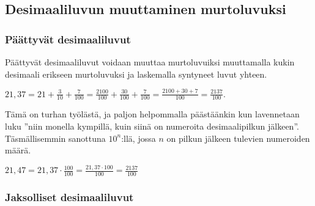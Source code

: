 
\subsection*{Desimaaliluvun muuttaminen murtoluvuksi}

\subsubsection*{Päättyvät desimaaliluvut}

Päättyvät desimaaliluvut voidaan muuttaa murtoluvuiksi muuttamalla kukin
desimaali erikseen murtoluvuksi ja laskemalla syntyneet luvut yhteen.

\begin{esimerkki}
$21,37 = 21+ \frac{3}{10}+\frac{7}{100} =
\frac{2100}{100}+\frac{30}{100}+\frac{7}{100}
 = \frac{2100+30+7}{100} = \frac{2137}{100}.$
\end{esimerkki}

Tämä on turhan työlästä, ja paljon helpommalla päästäänkin kun lavennetaan luku ''niin monella kympillä, kuin siinä on numeroita desimaalipilkun jälkeen''. Täsmällisemmin sanottuna $10^n$:llä, jossa $n$ on pilkun jälkeen tulevien numeroiden määrä.

\begin{esimerkki}
$21,47 = 21,37 \cdot  \frac{100}{100} = \frac{21,37 \cdot 100}{100} = \frac{2137}{100}$
\end{esimerkki}



\subsubsection*{Jaksolliset desimaaliluvut}


